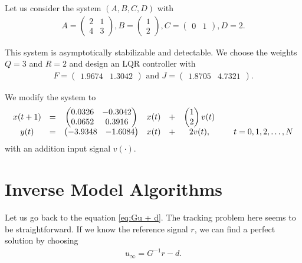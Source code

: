 \begin{exam}
	\label{ex:ILC:LQR}
Let us consider the system $(A,B,C,D)$ with 
\begin{align}
\label{eq:ILC:Sys_ex1}
A = \begin{pmatrix}
2 & 1 \\  4 & 3
\end{pmatrix}, B = \begin{pmatrix}
1 \\ 2
\end{pmatrix}, C = \begin{pmatrix}
0 & 1
\end{pmatrix}, D = 2.
\end{align}

This system is asymptotically stabilizable and detectable. We choose the weights $Q = 3$ and $R = 2$ and design an LQR controller with 
\begin{align}
F =\begin{pmatrix}
1.9674  &  1.3042
\end{pmatrix} \text{ and } 
J = \begin{pmatrix}
1.8705  &  4.7321
\end{pmatrix}. 
\end{align}

We modify the system to 
\begin{align}
\begin{array}{c c c c c c c c c}
x(t+1) &=&
\begin{pmatrix}
0.0326  & -0.3042\\
0.0652  &  0.3916
\end{pmatrix}
& x(t) &+& 
\begin{pmatrix}
1 \\ 2
\end{pmatrix}
v(t)& &
\\ 
y(t)   &=& \begin{pmatrix}
	-3.9348  & -1.6084
\end{pmatrix}
& x(t)& +&
 2 v (t),& &\; t = 0, 1, 2, \dots, N
\end{array}
\end{align} with an  addition input signal $v(\cdot)$. 

\end{exam}

\section{Inverse Model Algorithms}

Let us go back to the equation \eqref{eq:Gu + d}. 
The tracking problem here seems to be straightforward.
If we know the reference signal $r$, we can find a perfect solution by choosing 
\begin{align}
u_\infty = G^{-1} r -d.
\end{align}

